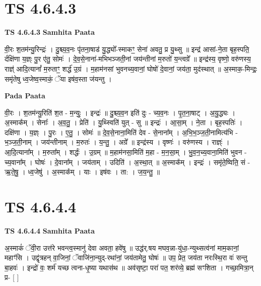\documentclass[17pt]{extarticle}
\begin{document}
\section*{ TS 4.6.4.3 }

\textbf{TS 4.6.4.3 } \newline
\textbf{Samhita Paata} \newline

वी॒रः श॒तम॑न्यु॒रिन्द्रः॑ । दु॒श्च्य॒व॒नः पृ॑तना॒षाड॑ यु॒द्ध्यो᳚-स्माकꣳ॒॒ सेना॑ अवतु॒ प्र यु॒थ्सु ॥ इन्द्र॑ आसां-ने॒ता बृह॒स्पति॒ र्दक्षि॑णा य॒ज्ञ्ः पु॒र ए॑तु॒ सोमः॑ । दे॒व॒से॒नाना॑-मभिभञ्जती॒नां जय॑न्तीनां म॒रुतो॑ य॒न्त्वग्रे᳚ ॥ इन्द्र॑स्य॒ वृष्णो॒ वरु॑णस्य॒ राज्ञ्॑ आदि॒त्यानां᳚ म॒रुताꣳ॒॒ शर्द्ध॑ उ॒ग्रं । म॒हाम॑नसां भुवनच्य॒वानां॒ घोषो॑ दे॒वानां॒ जय॑ता॒ मुद॑स्थात् ॥ अ॒स्माक॒-मिन्द्रः॒ समृ॑तेषु ध्व॒जेष्व॒स्माकं॒ ॅया इष॑व॒स्ता ज॑यन्तु । \newline

\textbf{Pada Paata} \newline

वी॒रः । श॒तम॑न्यु॒रिति॑ श॒त - म॒न्युः॒ । इन्द्रः॑ ॥ दु॒श्च्य॒व॒न इति॑ दुः - च्य॒व॒नः । पृ॒त॒ना॒षाट् । अ॒यु॒द्ध्यः । अ॒स्माक᳚म् । सेनाः᳚ । अ॒व॒तु॒ । प्रेति॑ । यु॒थ्स्विति॑ युत् - सु ॥ इन्द्रः॑ । आ॒सा॒म् । ने॒ता । बृह॒स्पतिः॑ । दक्षि॑णा । य॒ज्ञ्ः । पु॒रः । ए॒तु॒ । सोमः॑ ॥ दे॒व॒से॒नाना॒मिति॑ देव - से॒नाना᳚म् । अ॒भि॒भ॒ञ्ज॒ती॒नामित्य॑भि - भ॒ञ्ज॒ती॒नाम् । जय॑न्तीनाम् । म॒रुतः॑ । य॒न्तु॒ । अग्रे᳚ ॥ इन्द्र॑स्य । वृष्णः॑ । वरु॑णस्य । राज्ञ्ः॑ । आ॒दि॒त्याना᳚म् । म॒रुता᳚म् । शर्द्धः॑ । उ॒ग्रम् ॥ म॒हाम॑नसा॒मिति॑ म॒हा - म॒न॒सा॒म् । भु॒व॒न॒च्य॒वाना॒मिति॑ भुवन - च्य॒वाना᳚म् । घोषः॑ । दे॒वाना᳚म् । जय॑ताम् । उदिति॑ । अ॒स्था॒त् ॥ अ॒स्माक᳚म् । इन्द्रः॑ । समृ॑ते॒ष्विति॒ सं - ऋ॒ते॒षु॒ । ध्व॒जेषु॑ । अ॒स्माक᳚म् । याः । इष॑वः । ता: । ज॒य॒न्तु॒ ॥  \newline




\section*{ TS 4.6.4.4 }

\textbf{TS 4.6.4.4 } \newline
\textbf{Samhita Paata} \newline

अ॒स्माकं॑ ॅवी॒रा उत्त॑रे भवन्त्व॒स्मानु॑ देवा अवता॒ हवे॑षु ॥ उद्ध॑र्.षय मघव॒न्ना-यु॑धा॒-न्युथ्सत्व॑नां माम॒कानां॒ महाꣳ॑सि । उद्वृ॑त्रहन् वा॒जिनां॒ ॅवाजि॑ना॒न्युद्-रथा॑नां॒ जय॑तामेतु॒ घोषः॑ ॥ उप॒ प्रेत॒ जय॑ता नरःस्थि॒रा वः॑ सन्तु बा॒हवः॑ । इन्द्रो॑ वः॒ शर्म॑ यच्छ त्वना-धृ॒ष्या यथास॑थ ॥ अव॑सृष्टा॒ परा॑ पत॒ शर॑व्ये॒ ब्रह्म॑ सꣳशिता । गच्छा॒मित्रा॒न् प्र- [  ] \newline
\end{document}
